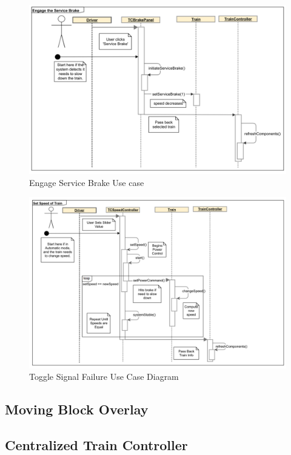 \documentclass[]{article}
\begin{document}
\begin{figure}[H]
	\centering
	\includegraphics[scale=.3]{tc_serviceBrake_usecase}
	\caption{Engage Service Brake Use case}
\end{figure}

\begin{figure}[H]
	\centering
	\includegraphics[scale=.3]{tc_setSpeed_usecase}
	\caption{Toggle Signal Failure Use Case Diagram}
\end{figure}



\subsection{Moving Block Overlay}
\subsection{Centralized Train Controller}
\end{document}
